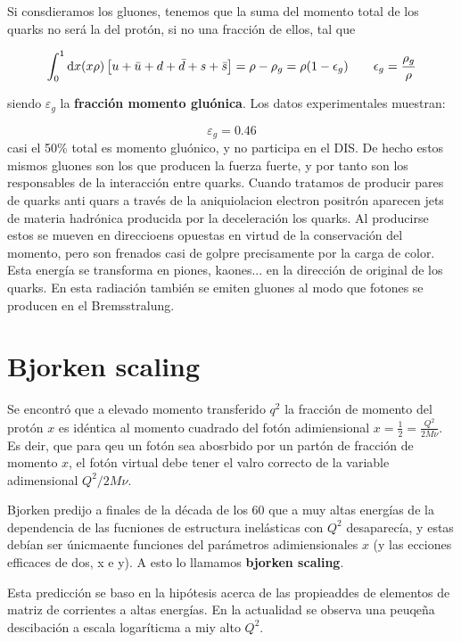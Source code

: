 Si consdieramos los gluones, tenemos que la suma del momento total de los quarks no será la del protón, si no una fracción de ellos, tal que

\begin{equation}
	\int_0^1 \mathrm{d} x  (x \rho) \left[ u + \bar{u} + d + \bar{d} + s + \bar{s} \right] 	= \rho - \rho_g = \rho (1 - \epsilon_g) \qquad \epsilon_g = \frac{\rho_g}{\rho}
\end{equation}

siendo $\varepsilon_g$ la \textbf{fracción momento gluónica}. Los datos experimentales muestran:

\begin{equation}
	\varepsilon_g = 0.46
\end{equation}
casi el 50\% total es momento gluónico, y no participa en el DIS. De hecho estos mismos gluones son los que producen la fuerza fuerte, y por tanto son los responsables de la interacción entre quarks. Cuando tratamos de producir pares de quarks anti quars a través de la aniquiolacion electron positrón aparecen jets de materia hadrónica producida por la deceleración los quarks. Al producirse estos se mueven en direccioens opuestas en virtud de la conservación del momento, pero son frenados casi de golpre precisamente por la carga de color. Esta energía se transforma en piones, kaones... en la dirección de original de los quarks. En esta radiación también se emiten gluones al modo que fotones se producen en el Bremsstralung.

\section{Bjorken scaling}

Se encontró que a elevado momento transferido $q^2$ la fracción de momento del protón $x$ es idéntica al momento cuadrado del fotón adimiensional $x=\frac{1}{2} = \frac{Q^2}{2 M \nu}$. Es deir, que para qeu un fotón sea abosrbido por un partón de fracción de momento $x$, el fotón virtual debe tener el valro correcto de la variable adimensional $Q^2/2M\nu$.

Bjorken predijo a finales de la década de los 60 que a muy altas energías de la dependencia de las fucniones de estructura inelásticas con $Q^2$ desaparecía, y estas debían ser únicmaente funciones del parámetros adimiensionales $x$ (y las ecciones efficaces de dos, x e y). A esto lo llamamos \textbf{bjorken scaling}.

Esta predicción se baso en la hipótesis acerca de las propieaddes de elementos de matriz de corrientes a altas energías. En la actualidad se observa una peuqeña descibación a escala logaríticma a miy alto $Q^2$. 